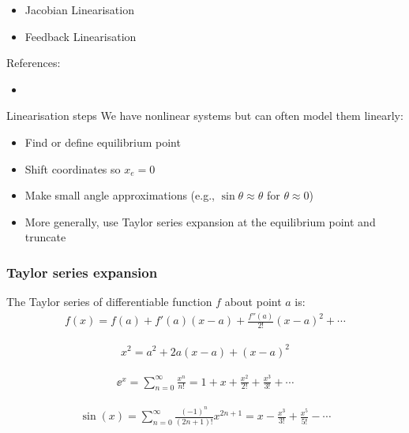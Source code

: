 \documentclass[10pt]{beamer-control}
\begin{document}

\begin{SUMMARY}
\begin{itemize}
\item Jacobian Linearisation
\item Feedback Linearisation
\end{itemize}
\vfill References:
\begin{itemize}
\item \astrom[§6.4]
\end{itemize}
\end{SUMMARY}




\begin{frame}{Linearisation steps}
We have nonlinear systems but can often model them linearly:
\begin{itemize}
\item Find or define equilibrium point
\item Shift coordinates so $x_e=0$
\item Make small angle approximations (e.g., $\sin\theta\approx\theta$ for $\theta\approx 0$)
\item More generally, use Taylor series expansion at the equilibrium point and truncate
\end{itemize}
\end{frame}

\begin{frame}
\frametitle{Taylor series expansion}
The Taylor series of differentiable function $f$ about point $a$ is:
\begin{align}
f(x) = f(a) + f'(a)(x - a) + \frac{f''(a)}{2!}(x - a)^2 + \cdots
\end{align}

\begin{align}
x^2 = a^2 + 2a(x - a) + (x - a)^2
\end{align}

\begin{align}
\ee^x = \sum_{n=0}^{\infty} \frac{x^n}{n!} = 1 + x + \frac{x^2}{2!} + \frac{x^3}{3!} + \cdots
\end{align}

\begin{align}
\sin(x) = \sum_{n=0}^{\infty} \frac{(-1)^n}{(2n+1)!} x^{2n+1} = x - \frac{x^3}{3!} + \frac{x^5}{5!} - \cdots
\end{align}
\end{frame}
\end{document}
